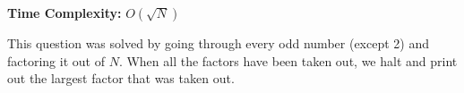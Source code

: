 \documentclass[12pt]{article}
\begin{document}
 
\noindent
\textbf{Time Complexity:} $O(\sqrt{N})$

\noindent
This question was solved by going through every odd number (except 2) and factoring it out of $N$. When all the factors have been taken out, we halt and print out the largest factor that was taken out. 
\end{document}
